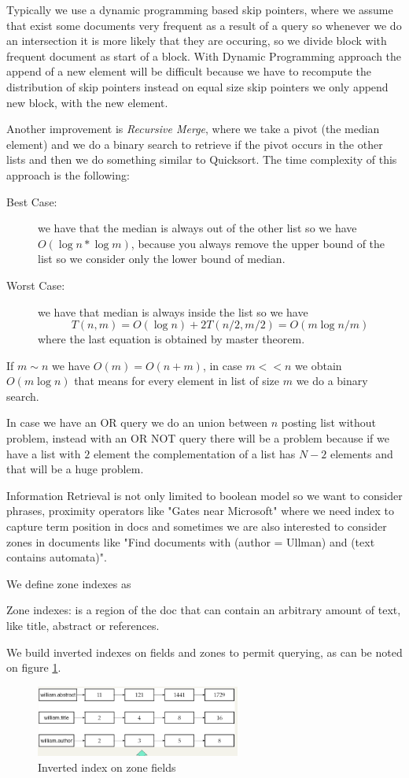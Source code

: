 Typically we use a dynamic programming based skip pointers, where we assume that exist some documents 
very frequent as a result of a query so whenever we do an intersection it is more likely that they are occuring,
so we divide block with frequent document as start of a block.\newline
With Dynamic Programming approach the append of a new element will be difficult because we have to recompute
the distribution of skip pointers instead on equal size skip pointers we only append new block, with the new element.

Another improvement is \emph{Recursive Merge}, where we take a pivot (the median element) and we do a 
binary search to retrieve if the pivot occurs in the other lists and then we do something similar to Quicksort.\newline
The time complexity of this approach is the following:
\begin{description}
    \item [Best Case: ] we have that the median is always out of the other list so we have $O(\log n * \log m)$, 
	                because you always remove the upper bound of the list so we consider only the lower bound of median.
    \item [Worst Case: ] we have that median is always inside the list so we have 
			 \[ T(n, m) = O(\log n) + 2T(n/2, m/2) = O(m \log n/m) \]
			 where the last equation is obtained by master theorem.
\end{description}
If $m \sim n$ we have $O(m) = O(n + m)$, in case $m << n$ we obtain $O(m \log n)$ that means for every element in list
of size $m$ we do a binary search.

In case we have an OR query we do an union between $n$ posting list without problem, instead with an OR NOT query
there will be a problem because if we have a list with $2$ element the complementation of a list has $N - 2$ 
elements and that will be a huge problem. 

Information Retrieval is not only limited to boolean model so we want to consider phrases, proximity operators
like "Gates near Microsoft" where we need index to capture term position in docs and sometimes we are also 
interested to consider zones in documents like "Find documents with (author = Ullman) and (text contains automata)".

We define zone indexes as
\begin{defi}
    Zone indexes: is a region of the doc that can contain an arbitrary amount of text, like title, abstract
                  or references.
\end{defi}
We build inverted indexes on fields and zones to permit querying, as can be noted on figure \ref{img:zoneIndex}.

\begin{figure}
    \includegraphics[width=0.6\textwidth]{Images/zoneIndex}
    \caption{Inverted index on zone fields}
    \label{img:zoneIndex}
\end{figure}



